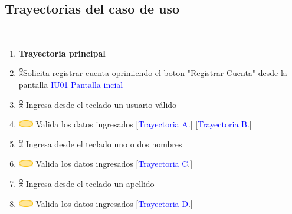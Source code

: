     \subsection{Trayectorias del caso de uso}
     \\
                \begin{enumerate}
                    \item \textbf{Trayectoria principal\\}
                        \item \includegraphics[width=0.0150\textwidth]{Figuras/persona.png}Solicita registrar cuenta oprimiendo el boton "Registrar Cuenta" desde la pantalla \textcolor{blue}{IU01 Pantalla incial}  
                        \item \includegraphics[width=0.0150\textwidth]{Figuras/persona.png} Ingresa desde el teclado un usuario válido 
                        \item \includegraphics[width=0.0500\textwidth]{Figuras/sistema.png} Valida los datos ingresados 
                        [\textcolor{blue}{Trayectoria A}.]
                        [\textcolor{blue}{Trayectoria B}.]
                        
                        \item \includegraphics[width=0.0150\textwidth]{Figuras/persona.png} Ingresa desde el teclado uno o dos nombres
                        \item \includegraphics[width=0.0500\textwidth]{Figuras/sistema.png} Valida los datos ingresados
                        [\textcolor{blue}{Trayectoria C}.]
                        
                        \item \includegraphics[width=0.0150\textwidth]{Figuras/persona.png} Ingresa desde el teclado un apellido 
                       \item \includegraphics[width=0.0500\textwidth]{Figuras/sistema.png} Valida los datos ingresados [\textcolor{blue}{Trayectoria D}.]


\end{enumerate}
